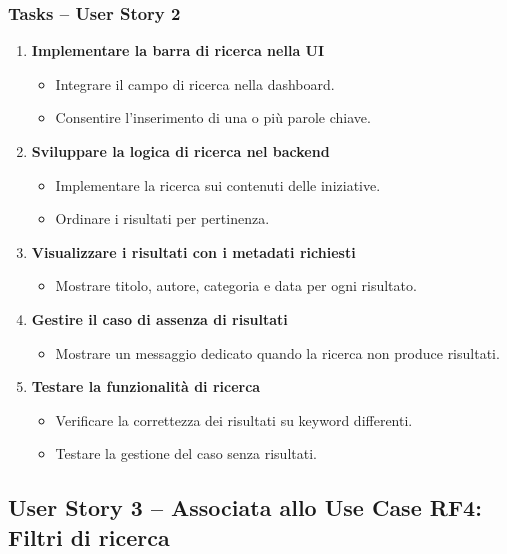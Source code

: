\documentclass{article}
\begin{document}
\subsubsection{Tasks -- User Story 2}
\begin{enumerate}
    \item \textbf{Implementare la barra di ricerca nella UI}
    \begin{itemize}
        \item Integrare il campo di ricerca nella dashboard.
        \item Consentire l'inserimento di una o più parole chiave.
    \end{itemize}

    \item \textbf{Sviluppare la logica di ricerca nel backend}
    \begin{itemize}
        \item Implementare la ricerca sui contenuti delle iniziative.
        \item Ordinare i risultati per pertinenza.
    \end{itemize}

    \item \textbf{Visualizzare i risultati con i metadati richiesti}
    \begin{itemize}
        \item Mostrare titolo, autore, categoria e data per ogni risultato.
    \end{itemize}

    \item \textbf{Gestire il caso di assenza di risultati}
    \begin{itemize}
        \item Mostrare un messaggio dedicato quando la ricerca non produce risultati.
    \end{itemize}

    \item \textbf{Testare la funzionalità di ricerca}
    \begin{itemize}
        \item Verificare la correttezza dei risultati su keyword differenti.
        \item Testare la gestione del caso senza risultati.
    \end{itemize}
\end{enumerate}


\subsection{User Story 3 -- Associata allo Use Case RF4: Filtri di ricerca}
\end{document}
